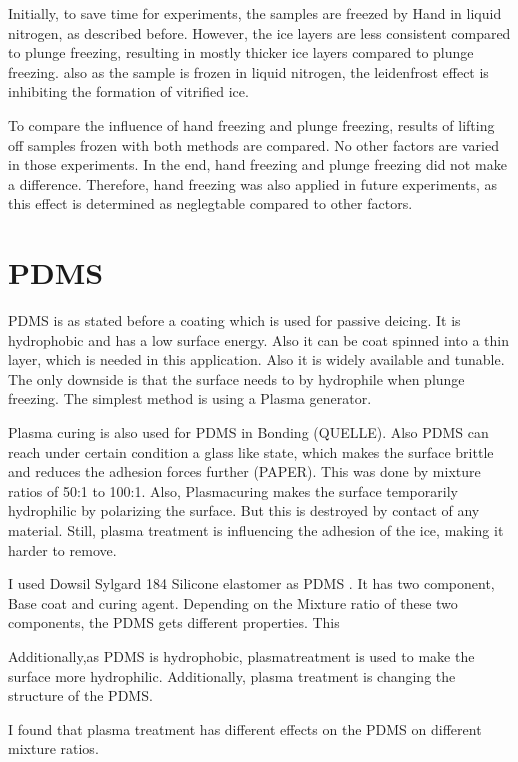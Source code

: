 Initially, to save time for experiments, the samples are freezed by Hand in liquid nitrogen, as described before. However, the ice layers are less consistent compared to plunge freezing, resulting in mostly thicker ice layers compared to plunge freezing. also as the sample is frozen in liquid nitrogen, the leidenfrost effect is inhibiting the formation of vitrified ice. 

To compare the influence of hand freezing and plunge freezing, results of lifting off samples frozen with both methods are compared. No other factors are varied in those experiments. In the end, hand freezing and plunge freezing did not make a difference. Therefore, hand freezing was also applied in future experiments, as this effect is determined as neglegtable compared to other factors.



\section{PDMS}

PDMS is as stated before a coating which is used for passive deicing. It is hydrophobic and has a low surface energy. Also it can be coat spinned into a thin layer, which is needed in this application. Also it is widely available and tunable. The only downside is that the surface needs to by hydrophile when plunge freezing. The simplest method is using a Plasma generator.

Plasma curing is also used for PDMS in Bonding (QUELLE). Also PDMS can reach under certain condition a glass like state, which makes the surface brittle and reduces the adhesion forces further (PAPER). This was done by mixture ratios of 50:1 to 100:1. Also, Plasmacuring makes the surface temporarily hydrophilic by polarizing the surface. But this is destroyed by contact of any material. Still, plasma treatment is influencing the adhesion of the ice, making it harder to remove.

I used Dowsil Sylgard 184 Silicone elastomer as PDMS \cite{DOW.}. It has two component, Base coat and curing agent. Depending on the Mixture ratio of these two components, the PDMS gets different properties. This 

Additionally,as PDMS is hydrophobic, plasmatreatment is used to make the surface more hydrophilic. Additionally, plasma treatment is changing the structure of the PDMS. 

I found that plasma treatment has different effects on the PDMS on different mixture ratios. 

